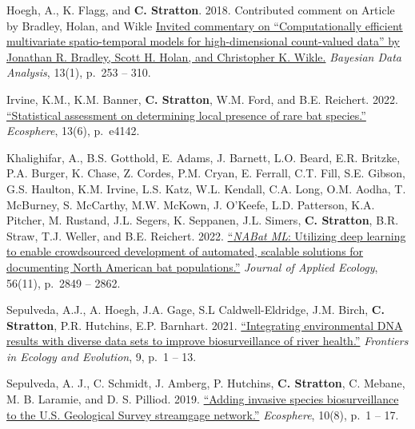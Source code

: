 \documentclass[a4paper]{article}
\begin{document}
Hoegh, A., K. Flagg, and \textbf{C. Stratton}. 2018. Contributed comment
on Article by Bradley, Holan, and Wikle
\href{https://eds.p.ebscohost.com/abstract?site=eds\&scope=site\&jrnl=19360975\&AN=138950462\&h=fupOc1pyeH8dv67mdPoRzhYvo96LS\%2bzCYNHIjAcMPojnVBydkua\%2fXFU6RanU78MDh8WNMlzPVI\%2fBxvaUiWvg\%2bw\%3d\%3d\&crl=c\&resultLocal=ErrCrlNoResults\&resultNs=Ehost\&crlhashurl=login.aspx\%3fdirect\%3dtrue\%26profile\%3dehost\%26scope\%3dsite\%26authtype\%3dcrawler\%26jrnl\%3d19360975\%26AN\%3d138950462}{Invited
commentary on ``Computationally efficient multivariate spatio-temporal
models for high-dimensional count-valued data'' by Jonathan R. Bradley,
Scott H. Holan, and Christopher K. Wikle.}
\textit{Bayesian Data Analysis}, 13(1), p.~253 -- 310. \vspace*{2mm}

Irvine, K.M., K.M. Banner, \textbf{C. Stratton}, W.M. Ford, and B.E.
Reichert. 2022. \href{https://doi.org/10.1002/ecs2.4142}{``Statistical
assessment on determining local presence of rare bat species.''}
\textit{Ecosphere}, 13(6), p.~e4142. \vspace*{2mm}

Khalighifar, A., B.S. Gotthold, E. Adams, J. Barnett, L.O. Beard, E.R.
Britzke, P.A. Burger, K. Chase, Z. Cordes, P.M. Cryan, E. Ferrall, C.T.
Fill, S.E. Gibson, G.S. Haulton, K.M. Irvine, L.S. Katz, W.L. Kendall,
C.A. Long, O.M. Aodha, T. McBurney, S. McCarthy, M.W. McKown, J.
O'Keefe, L.D. Patterson, K.A. Pitcher, M. Rustand, J.L. Segers, K.
Seppanen, J.L. Simers, \textbf{C. Stratton}, B.R. Straw, T.J. Weller,
and B.E. Reichert. 2022.
\href{https://doi.org/10.1111/1365-2664.14280}{``\emph{NABat ML}:
Utilizing deep learning to enable crowdsourced development of automated,
scalable solutions for documenting North American bat populations.''}
\textit{Journal of Applied Ecology}, 56(11), p.~2849 -- 2862.
\vspace*{2mm}

Sepulveda, A.J., A. Hoegh, J.A. Gage, S.L Caldwell-Eldridge, J.M. Birch,
\textbf{C. Stratton}, P.R. Hutchins, E.P. Barnhart. 2021.
\href{https://doi.org/10.3389/fevo.2021.620715}{``Integrating
environmental DNA results with diverse data sets to improve
biosurveillance of river health.''}
\textit{Frontiers in Ecology and Evolution}, 9, p.~1 -- 13.
\vspace*{2mm}

Sepulveda, A. J., C. Schmidt, J. Amberg, P. Hutchins,
\textbf{C. Stratton}, C. Mebane, M. B. Laramie, and D. S. Pilliod. 2019.
\href{https://doi.org/10.1002/ecs2.2843}{``Adding invasive species
biosurveillance to the U.S. Geological Survey streamgage network.''}
\textit{Ecosphere}, 10(8), p.~1 -- 17. \vspace*{2mm}
\end{document}
